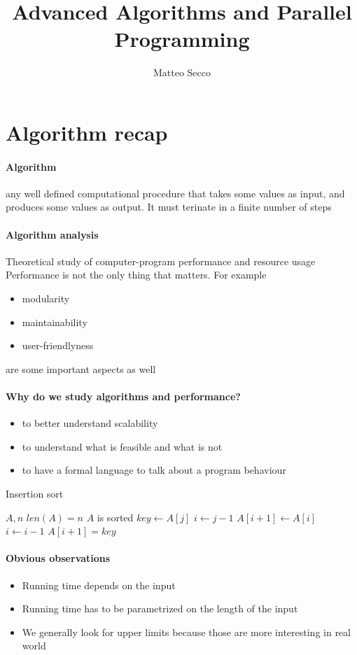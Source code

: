 \documentclass{article}
\author{Matteo Secco}
\title{Advanced Algorithms and Parallel Programming}
\begin{document}
\maketitle
\newpage
\tableofcontents
\newpage
\section{Algorithm recap}
\paragraph{Algorithm} any well defined computational procedure that takes some values as input, and produces some values as output. It must terinate in a finite number of steps
\paragraph{Algorithm analysis} Theoretical study of computer-program performance and resource usage
Performance is not the only thing that matters. For example
\begin{itemize}
\item modularity
\item maintainability
\item user-friendlyness
\end{itemize}
are some important aspects as well
\paragraph{Why do we study algorithms and performance?} 
\begin{itemize}
\item to better understand scalability
\item to understand what is feasible and what is not
\item to have a formal language to talk about a program behaviour
\end{itemize}
\begin{algorithm}
\caption{Insertion sort}
\begin{algorithmic}
\REQUIRE $A,n$
\REQUIRE $len(A)=n$
\ENSURE $A$ is sorted
	\STATE $key \leftarrow A[j]$
	\STATE $i \leftarrow j-1$
		\STATE $A[i+1] \leftarrow A[i]$
		\STATE $i \leftarrow i-1$
	\ENDWHILE
	\STATE $A[i+1]=key$
\ENDFOR
\end{algorithmic}
\end{algorithm}
\paragraph{Obvious observations}
\begin{itemize}
\item Running time depends on the input
\item Running time has to be parametrized on the length of the input
\item We generally look for upper limits because those are more interesting in real world
\end{itemize}
\end{document}
